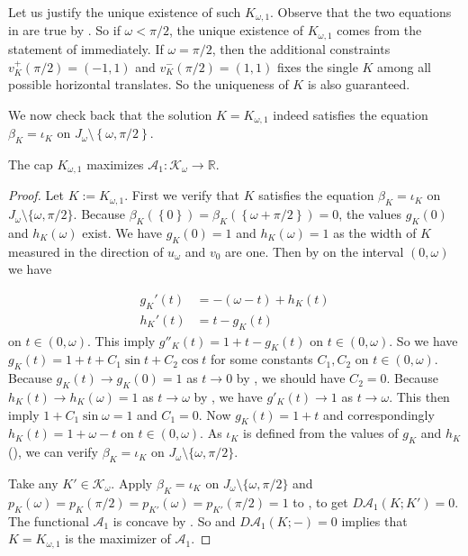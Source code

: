 Let us justify the unique existence of such \(K_{\omega, 1}\). Observe that the two equations in  are true by . So if \(\omega < \pi/2\), the unique existence of \(K_{\omega, 1}\) comes from the statement of  immediately. If \(\omega = \pi/2\), then the additional constraints \(v_K^+(\pi/2) = (-1, 1)\) and \(v_K^-(\pi/2) = (1, 1)\) fixes the single \(K\) among all possible horizontal translates. So the uniqueness of \(K\) is also guaranteed.

We now check back that the solution \(K = K_{\omega, 1}\) indeed satisfies the equation \(\beta_K = \iota_K\) on \(J_\omega \setminus \left\{ \omega, \pi/2 \right\}\).

\begin{theorem}

The cap \(K_{\omega, 1}\) maximizes \(\mathcal{A}_1 : \mathcal{K}_{\omega} \to \mathbb{R}\).

\label{thm:maximum-presofa-a1}
\end{theorem}

\begin{proof}
Let \(K := K_{\omega, 1}\). First we verify that \(K\) satisfies the equation \(\beta_K = \iota_K\) on \(J_\omega \setminus \{\omega, \pi/2\}\). Because \(\beta_K(\left\{ 0 \right\}) = \beta_K(\left\{ \omega + \pi/2 \right\}) = 0\), the values \(g_K(0)\) and \(h_K(\omega)\) exist. We have \(g_K(0) = 1\) and \(h_K(\omega) = 1\) as the width of \(K\) measured in the direction of \(u_\omega\) and \(v_0\) are one. Then by  on the interval \((0, \omega)\) we have

\begin{align*}
g_{K}'(t) & = -\left( \omega - t \right)  + h_{K}(t) \\
h_K'(t) & = t - g_K(t)
\end{align*}
on \(t \in (0, \omega)\). This imply \(g''_K(t) = 1 + t - g_K(t)\) on \(t \in (0, \omega)\). So we have \(g_K(t) = 1 + t + C_1 \sin t + C_2 \cos t\) for some constants \(C_1, C_2\) on \(t \in (0, \omega)\). Because \(g_K(t) \to g_K(0) = 1\) as \(t \to 0\) by , we should have \(C_2 = 0\). Because \(h_K(t) \to h_K(\omega) = 1\) as \(t \to \omega\) by , we have \(g'_K(t) \to 1\) as \(t \to \omega\). This then imply \(1 + C_1 \sin \omega = 1\) and \(C_1 = 0\). Now \(g_K(t) = 1 + t\) and correspondingly \(h_K(t) = 1 + \omega - t\) on \(t \in (0, \omega)\). As \(\iota_K\) is defined from the values of \(g_K\) and \(h_K\) (), we can verify \(\beta_K = \iota_K\) on \(J_\omega \setminus \{\omega, \pi/2\}\).

Take any \(K' \in \mathcal{K}_\omega\). Apply \(\beta_K = \iota_K\) on \(J_\omega \setminus \{\omega, \pi/2\}\) and \(p_K(\omega) = p_K(\pi/2) = p_{K'}(\omega) = p_{K'}(\pi/2) = 1\) to , to get \(D\mathcal{A}_1(K; K') = 0\). The functional \(\mathcal{A}_1\) is concave by . So  and \(D\mathcal{A}_1(K; -) = 0\) implies that \(K = K_{\omega, 1}\) is the maximizer of \(\mathcal{A}_1\).
\end{proof}

